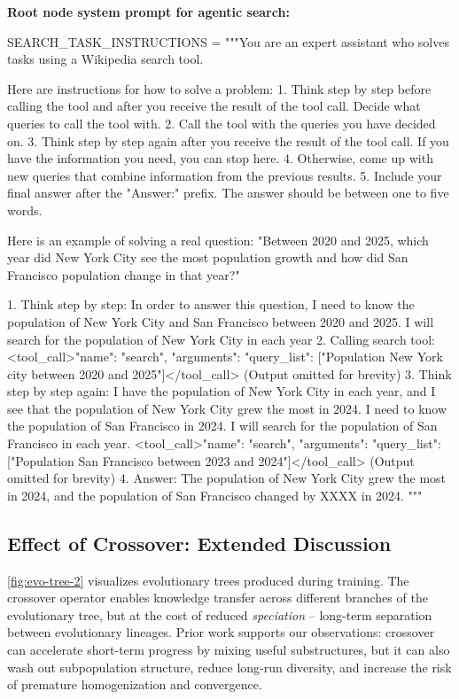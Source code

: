 \documentclass{article}
\theoremstyle{plain}
\theoremstyle{definition}
\theoremstyle{remark}
\begin{document}
\textbf{Root node system prompt for agentic search:}
\begin{WrapVerbatim}
SEARCH_TASK_INSTRUCTIONS = """You are an expert assistant who solves tasks using a Wikipedia search tool.

Here are instructions for how to solve a problem:
1. Think step by step before calling the tool and after you receive the result of the tool call. Decide what queries to call the tool with.
2. Call the tool with the queries you have decided on.
3. Think step by step again after you receive the result of the tool call. If you have the information you need, you can stop here.
4. Otherwise, come up with new queries that combine information from the previous results.
5. Include your final answer after the "Answer:" prefix. The answer should be between one to five words.

Here is an example of solving a real question:
"Between 2020 and 2025, which year did New York City see the most population growth and how did San Francisco population change in that year?"

1. Think step by step: In order to answer this question, I need to know the population of New York City and San Francisco between 2020 and 2025. I will search for the population of New York City in each year
2. Calling search tool: <tool_call>{"name": "search", "arguments": {"query_list": ["Population New York city between 2020 and 2025"]}}</tool_call> (Output omitted for brevity)
3. Think step by step again: I have the population of New York City in each year, and I see that the population of New York City grew the most in 2024. I need to know the population of San Francisco in 2024. I will search for the population of San Francisco in each year.
<tool_call>{"name": "search", "arguments": {"query_list": ["Population San Francisco between 2023 and 2024"]}}</tool_call> (Output omitted for brevity)
4. Answer: The population of New York City grew the most in 2024, and the population of San Francisco changed by XXXX in 2024.
"""
\end{WrapVerbatim}

\clearpage
\newpage


\subsection{Effect of Crossover: Extended Discussion}

\autoref{fig:evo-tree-2} visualizes evolutionary trees produced during training. The crossover operator enables knowledge transfer across different branches of the evolutionary tree, but at the cost of reduced \emph{speciation} -- long-term separation between evolutionary lineages. Prior work \citep{ga-in-search, eshelman1991preventing, mahfoud1995niching, vose1999-simple-ga} supports our observations: crossover can accelerate short-term progress by mixing useful substructures, but it can also wash out subpopulation structure, reduce long-run diversity, and increase the risk of premature homogenization and convergence.
\end{document}
